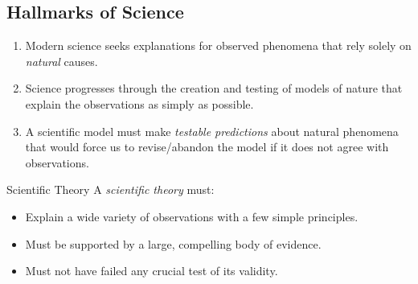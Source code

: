 \documentclass[class=article, crop=false]{standalone}
\begin{document}
  \subsection{Hallmarks of Science}
  \begin{enumerate}
    \item Modern science seeks explanations for observed phenomena that rely solely on \emph{natural} causes.
    \item Science progresses through the creation and testing of models of nature that explain the observations as simply as possible.
    \item A scientific model must make \emph{testable predictions} about natural phenomena that would force us to revise/abandon the model if it does not agree with observations.
  \end{enumerate}
  \begin{definition}{Scientific Theory}
    A \emph{scientific theory} must:
    \begin{itemize}
      \item Explain a wide variety of observations with a few simple principles.
      \item Must be supported by a large, compelling body of evidence.
      \item Must not have failed any crucial test of its validity.
    \end{itemize}
  \end{definition}
\end{document}
